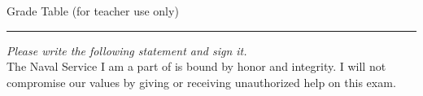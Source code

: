 \documentclass[12pt]{exam}
\begin{document}
\bigskip
\begin{center}
Grade Table (for teacher use only)\\
\addpoints
\gradetable[v][questions]
\end{center}

\noindent
\rule[2ex]{\textwidth}{2pt}

\emph{Please write the following statement and sign it.}\\
The Naval Service I am a part of is bound by honor
and integrity. I will not compromise our values by
giving or receiving unauthorized help on this exam.

\newpage %


        

\newpage
\end{document}
